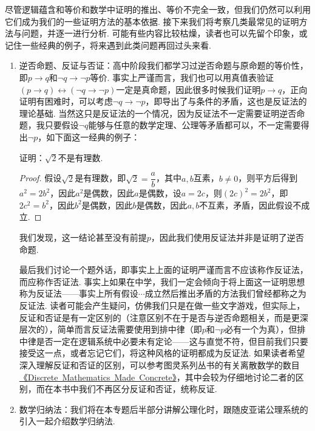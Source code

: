 尽管逻辑蕴含和等价和数学中证明的推出、等价不完全一致，但我们仍然可以利用它们成为我们的一些证明方法的基本依据. 接下来我们将考察几类最常见的证明方法与问题，并逐一进行分析. 可能有些内容比较枯燥，读者也可以先留个印象，或记住一些经典的例子，将来遇到此类问题再回过头来看.

\begin{enumerate}
    \item 逆否命题、反证与否证：高中阶段我们都学习过逆否命题与原命题的等价性，即$p\to q$和$\lnot q\to\lnot p$等价. 事实上严谨而言，我们也可以用真值表验证$(p\to q)\leftrightarrow(\lnot q\to\lnot p)$一定是真命题，因此很多时候我们证明$p\to q$，正向证明有困难时，可以考虑$\lnot q\to\lnot p$，即导出了与条件的矛盾，这也是反证法的理论基础. 当然这只是反证法的一个情况，因为反证法不一定需要证明逆否命题，我只要假设$\lnot q$能够与任意的数学定理、公理等矛盾都可以，不一定需要得出$\lnot p$，如下面这一经典的例子：

    \begin{example*}
        证明：$\sqrt{2}$不是有理数.
    \end{example*}
    \begin{proof}
        假设$\sqrt{2}$是有理数，即$\sqrt{2}=\dfrac{a}{b}$，其中$a,b$互素，$b\neq 0$，则平方后得到$a^2=2b^2$，因此$a^2$是偶数，因此$a$是偶数，设$a=2c$，则$(2c)^2=2b^2$，即$2c^2=b^2$，因此$b^2$是偶数，因此$b$是偶数，因此$a,b$不互素，矛盾，因此假设不成立.
    \end{proof}

    我们发现，这一结论甚至没有前提$p$，因此我们使用反证法并非是证明了逆否命题.

    最后我们讨论一个题外话，即事实上上面的证明严谨而言不应该称作反证法，而应称作否证法. 事实上如果在中学，我们一定会倾向于将上面这一证明思想称为反证法——事实上所有假设$\cdots$成立然后推出矛盾的方法我们曾经都称之为反证法. 读者可能会产生疑问，仿佛我们只是在做一些文字游戏，但实际上，反证和否证是有一定区别的（注意区别不在于是否与逆否命题相关，而是更深层次的），简单而言反证法需要使用到排中律（即$p$和$\lnot p$必有一个为真），但排中律是否一定在逻辑系统中必要未有定论——这与直觉不符，但目前我们只要接受这一点，或者忘记它们，将这种风格的证明都成为反证法. 如果读者希望深入理解反证和否证的区别，可以参考图灵系列丛书的有关离散数学的数目\href{https://github.com/FrightenedFoxCN/Discrete-Mathematics-Made-Concrete}{《Discrete\ Mathematics\ Made\ Concrete》}，其中会较为仔细地讨论二者的区别，而在本书中我们不再区分反证和否证，统称反证.

    \item 数学归纳法：我们将在本专题后半部分讲解公理化时，跟随皮亚诺公理系统的引入一起介绍数学归纳法.


\end{enumerate}
